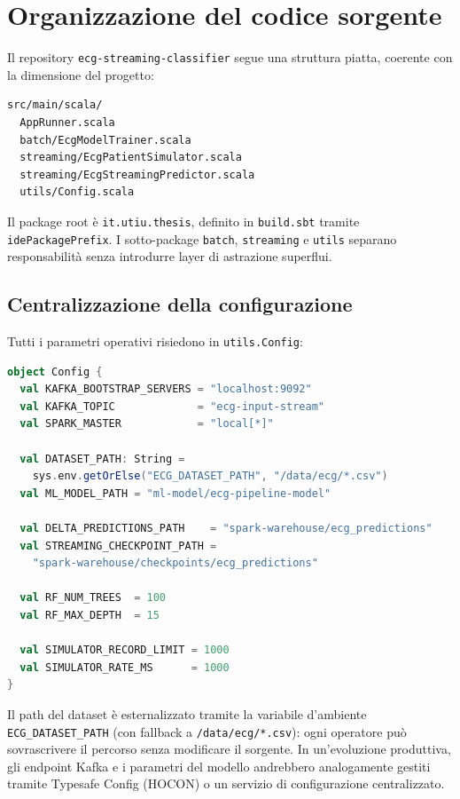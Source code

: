 \section{Organizzazione del codice sorgente}\label{sec:organizzazione-codice}

Il repository \texttt{ecg-streaming-classifier} segue una struttura piatta, coerente con la dimensione del progetto:

\begin{verbatim}
src/main/scala/
  AppRunner.scala
  batch/EcgModelTrainer.scala
  streaming/EcgPatientSimulator.scala
  streaming/EcgStreamingPredictor.scala
  utils/Config.scala
\end{verbatim}

Il package root è \texttt{it.utiu.thesis}, definito in \texttt{build.sbt} tramite \texttt{idePackagePrefix}.
I sotto-package \texttt{batch}, \texttt{streaming} e \texttt{utils} separano responsabilità senza introdurre layer di astrazione superflui.

\subsection{Centralizzazione della configurazione}

Tutti i parametri operativi risiedono in \texttt{utils.Config}:

\begin{lstlisting}[language=Scala,caption={Parametri centralizzati in \texttt{Config.scala}.},label={lst:config}]
object Config {
  val KAFKA_BOOTSTRAP_SERVERS = "localhost:9092"
  val KAFKA_TOPIC             = "ecg-input-stream"
  val SPARK_MASTER            = "local[*]"

  val DATASET_PATH: String =
    sys.env.getOrElse("ECG_DATASET_PATH", "/data/ecg/*.csv")
  val ML_MODEL_PATH = "ml-model/ecg-pipeline-model"

  val DELTA_PREDICTIONS_PATH    = "spark-warehouse/ecg_predictions"
  val STREAMING_CHECKPOINT_PATH =
    "spark-warehouse/checkpoints/ecg_predictions"

  val RF_NUM_TREES  = 100
  val RF_MAX_DEPTH  = 15

  val SIMULATOR_RECORD_LIMIT = 1000
  val SIMULATOR_RATE_MS      = 1000
}
\end{lstlisting}

Il path del dataset è esternalizzato tramite la variabile d'ambiente \texttt{ECG\_DATASET\_PATH} (con fallback a \texttt{/data/ecg/*.csv}): ogni operatore può sovrascrivere il percorso senza modificare il sorgente.
In un'evoluzione produttiva, gli endpoint Kafka e i parametri del modello andrebbero analogamente gestiti tramite Typesafe Config (HOCON) o un servizio di configurazione centralizzato.

